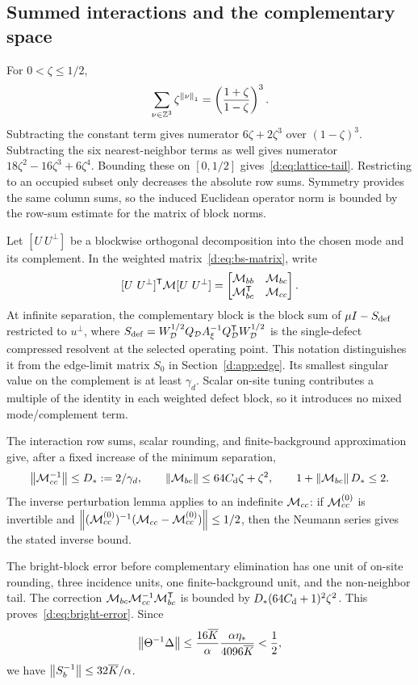 \subsection{Summed interactions and the complementary space}

For $0<\zeta\le1/2$,
\[
 \sum_{\nu\in\mathbb Z^3}\zeta^{\left\lVert \nu\right\rVert_1}
 =\left(\frac{1+\zeta}{1-\zeta}\right)^3.
\]
Subtracting the constant term gives numerator $6\zeta+2\zeta^3$ over $(1-\zeta)^3$. Subtracting the six nearest-neighbor terms as well gives numerator $18\zeta^2-16\zeta^3+6\zeta^4$. Bounding these on $[0,1/2]$ gives~\eqref{d:eq:lattice-tail}. Restricting to an occupied subset only decreases the absolute row sums. Symmetry provides the same column sums, so the induced Euclidean operator norm is bounded by the row-sum estimate for the matrix of block norms.

Let $[U\ U^\perp]$ be a blockwise orthogonal decomposition into the chosen mode and its complement. In the weighted matrix~\eqref{d:eq:bs-matrix}, write
\[
 [U\ U^\perp]^{\mathsf T}\mathcal M[U\ U^\perp]
 =\begin{bmatrix}\mathcal M_{bb}&\mathcal M_{bc}\\\mathcal M_{bc}^{\mathsf T}&\mathcal M_{cc}\end{bmatrix}.
\]
At infinite separation, the complementary block is the block sum of $\mu I-S_{\rm def}$ restricted to $u^\perp$, where $S_{\rm def}=W_{\mathcal D}^{1/2}Q_{\mathcal D}A_\xi^{-1}Q_{\mathcal D}^{\mathsf T}W_{\mathcal D}^{1/2}$ is the single-defect compressed resolvent at the selected operating point. This notation distinguishes it from the edge-limit matrix $S_0$ in Section~\ref{d:app:edge}. Its smallest singular value on the complement is at least $\gamma_d$. Scalar on-site tuning contributes a multiple of the identity in each weighted defect block, so it introduces no mixed mode/complement term.

The interaction row sums, scalar rounding, and finite-background approximation give, after a fixed increase of the minimum separation,
\begin{equation}\label{d:eq:app-complement}
 \left\lVert \mathcal M_{cc}^{-1}\right\rVert\le D_*:=2/\gamma_d,\qquad
 \left\lVert \mathcal M_{bc}\right\rVert\le64C_{\rm d}\zeta+\zeta^2,\qquad
 1+\left\lVert \mathcal M_{bc}\right\rVert D_*\le2.
\end{equation}
The inverse perturbation lemma applies to an indefinite $\mathcal M_{cc}$: if $\mathcal M_{cc}^{(0)}$ is invertible and $\left\lVert (\mathcal M_{cc}^{(0)})^{-1}(\mathcal M_{cc}-\mathcal M_{cc}^{(0)})\right\rVert\le1/2$, then the Neumann series gives the stated inverse bound.

The bright-block error before complementary elimination has one unit of on-site rounding, three incidence units, one finite-background unit, and the non-neighbor tail. The correction $\mathcal M_{bc}\mathcal M_{cc}^{-1}\mathcal M_{bc}^{\mathsf T}$ is bounded by $D_*(64C_{\rm d}+1)^2\zeta^2$. This proves~\eqref{d:eq:bright-error}. Since
\[
 \left\lVert \Theta^{-1}\Delta\right\rVert\le\frac{16\overline K}{\alpha}
 \frac{\alpha\eta_*}{4096\overline K}<\frac12,
\]
we have $\left\lVert S_b^{-1}\right\rVert\le32\overline K/\alpha$.

